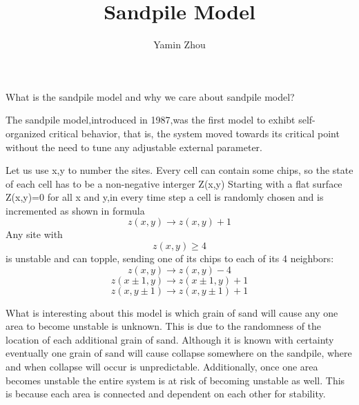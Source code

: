 \documentclass{beamer}
\title{Sandpile Model}
\author{Yamin Zhou}\institute{University of Washington}
\begin{document}
\begin{frame}
\titlepage

\end{frame}

\begin{frame}
What is the sandpile model and why we care about sandpile model?
\end{frame}

\begin{frame}
The sandpile model,introduced in 1987,was the first model to exhibt self-organized critical behavior, that is, the system moved towards its critical point without the need to tune any adjustable external parameter.
\end{frame}


\begin{frame}
Let us use x,y to number the sites. Every cell can contain some chips, so the state of each cell has to be a non-negative interger Z(x,y) Starting with a flat surface Z(x,y)=0 for all x and y,in every time step a cell is randomly chosen and is incremented as shown in formula$$z\left ( x,y \right )\rightarrow z\left ( x,y \right )+1$$
Any site with$$z\left ( x,y \right )\geq 4$$ is unstable and can topple, sending one of its chips to each of its 4 neighbors:
$$z\left ( x,y \right )\rightarrow z\left ( x,y \right )-4$$
$$z\left ( x\pm 1,y \right )\rightarrow z\left ( x\pm 1,y \right )+1$$
$$z\left ( x,y \pm 1\right )\rightarrow z\left ( x,y\pm 1 \right )+1$$
\end{frame}


\begin{frame}
What is interesting about this model is which grain of sand will cause any one area to become unstable is unknown. This is due to the randomness of the location of each additional grain of sand. Although it is known with certainty eventually one grain of sand will cause collapse somewhere on the sandpile, where and when collapse will occur is unpredictable. Additionally, once one area becomes unstable the entire system is at risk of becoming unstable as well. This is because each area is connected and dependent on each other for stability.
\end{frame}
\end{document}

